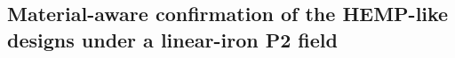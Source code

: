 %
%
\subsection{Material-aware confirmation of the HEMP-like designs under a linear-iron P2 field}
\label{sec:l1b-hemp-confirmation-screening}

